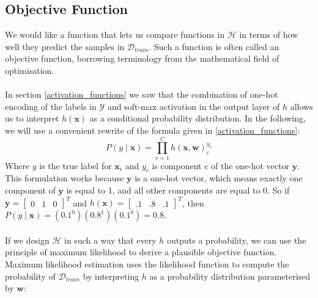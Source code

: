 \subsection{Objective Function}
\label{objectiveFunction}
We would like a function that lets us compare functions in $\mathcal{H}$ in terms of how well they predict the samples in $\mathcal{D}_{train}$. Such a function is often called an objective function, borrowing terminology from the mathematical field of optimisation.
\\\\
In section \ref{activation_functions} we saw that the combination of one-hot encoding of the labels in $\mathcal{Y}$ and soft-max activation in the output layer of $h$ allows us to interpret $h(\mathbf{x})$ as a conditional probability distribution. In the following, we will use a convenient rewrite of the formula given in \ref{activation_functions}:
$$
P(y \mid \mathbf{x}) = \prod\limits_{c=1}^C h(\mathbf{x},\mathbf{w})^{y_c}_c
$$
Where $y$ is the true label for $\mathbf{x}_i$ and $y_c$ is component c of the one-hot vector $\mathbf{y}$. 
This formulation works because $\mathbf{y}$ is a one-hot vector, which means exactly one component of $\mathbf{y}$ is equal to 1, and all other components are equal to 0. So if $\mathbf{y} = \begin{bmatrix}0 & 1 & 0 \end{bmatrix}^T$ and $h(\mathbf{x}) = \begin{bmatrix}.1 & .8 & .1 \end{bmatrix}^T$, then $P(y \mid \mathbf{x}) = (0.1^0)(0.8^1)(0.1^0) = 0.8$.
\\\\
If we design $\mathcal{H}$ in such a way that every $h$ outputs a probability, we can use the principle of maximum likelihood to derive a plausible objective function. Maximum likelihood estimation uses the likelihood function to compute the probability of $\mathcal{D}_{train}$ by interpreting $h$ as a probability distribution parameterised by $\mathbf{w}$:

